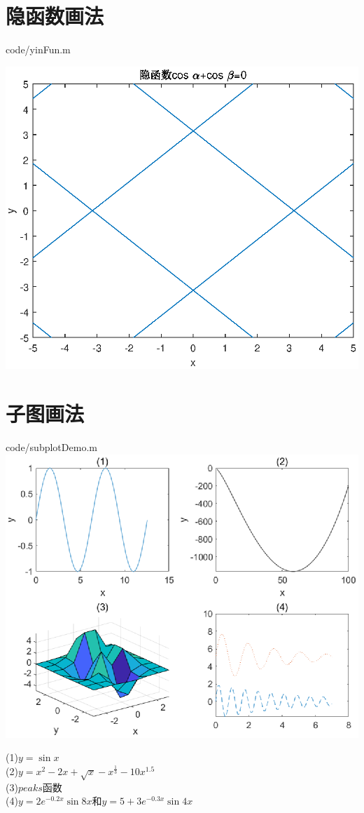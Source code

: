 \documentclass{hfutpaper}
\makeatletter
\newcommand{\figcaption}{\def\@captype{figure}\caption}
\makeatother
\begin{document}
\section*{隐函数画法}

{code/yinFun.m}

\includegraphics{figure/yinFunc}
\figcaption{隐函数$\cos \alpha+\cos \beta=0$}
\section*{子图画法}

{code/subplotDemo.m}
\includegraphics{figure/subplot}
\figcaption{子图画法}
\begin{center}
	(1)$y=\sin x$\\(2)$y=x^2-2x+\sqrt{x}-x^{\frac{1}{3}}-10x^{1.5}$\\
	(3)$peaks$函数\\(4)$y=2e^{-0.2x}\sin 8x$和$y=5+3e^{-0.3x}\sin 4x$
\end{center}
\end{document}
